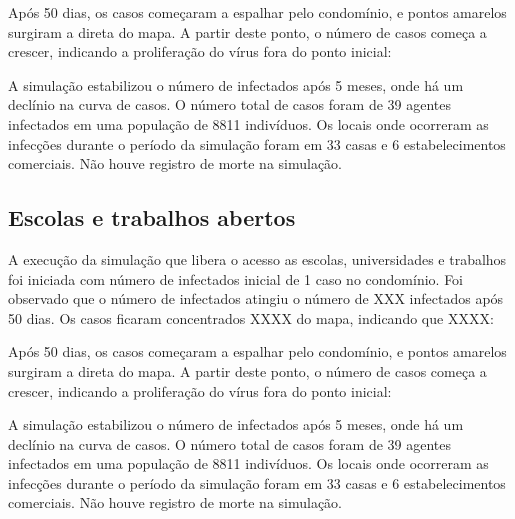 
Após 50 dias, os casos começaram a espalhar pelo condomínio, e pontos amarelos surgiram a direta do mapa. A partir deste ponto, o número de casos começa a crescer, indicando a proliferação do vírus fora do ponto inicial:



A simulação estabilizou o número de infectados após 5 meses, onde há um declínio na curva de casos. O número total de casos foram de 39 agentes infectados em uma população de 8811 indivíduos. Os locais onde ocorreram as infecções durante o período da simulação foram em 33 casas e 6 estabelecimentos comerciais. Não houve registro de morte na simulação.

\subsection{Escolas e trabalhos abertos}

A execução da simulação que libera o acesso as escolas, universidades e trabalhos foi iniciada com número de infectados inicial de 1 caso no condomínio. Foi observado que o número de infectados atingiu o número de XXX infectados após 50 dias. Os casos ficaram concentrados XXXX do mapa, indicando que XXXX:


Após 50 dias, os casos começaram a espalhar pelo condomínio, e pontos amarelos surgiram a direta do mapa. A partir deste ponto, o número de casos começa a crescer, indicando a proliferação do vírus fora do ponto inicial:



A simulação estabilizou o número de infectados após 5 meses, onde há um declínio na curva de casos. O número total de casos foram de 39 agentes infectados em uma população de 8811 indivíduos. Os locais onde ocorreram as infecções durante o período da simulação foram em 33 casas e 6 estabelecimentos comerciais. Não houve registro de morte na simulação.




